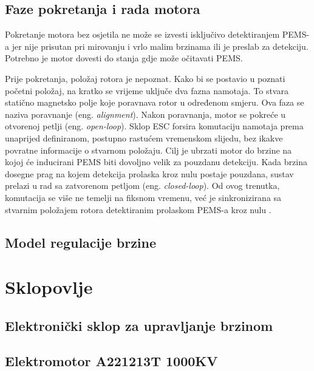 \documentclass[diplomskirad]{fer}
\begin{document}
\newpage

\section{Faze pokretanja i rada motora}

Pokretanje motora bez osjetila ne može se izvesti isključivo detektiranjem
PEMS-a jer nije prisutan pri mirovanju i vrlo malim brzinama ili je preslab za
detekciju. Potrebno je motor dovesti do stanja gdje može očitavati PEMS.

Prije pokretanja, položaj rotora je nepoznat. Kako bi se postavio u poznati
početni položaj, na kratko se vrijeme uključe dva fazna namotaja. To stvara
statično magnetsko polje koje poravnava rotor u određenom smjeru. Ova faza se
naziva poravnanje (eng. \textit{alignment}). Nakon poravnanja, motor se pokreće
u otvorenoj petlji (eng. \textit{open-loop}). Sklop ESC forsira komutaciju
namotaja prema unaprijed definiranom, postupno rastućem vremenskom slijedu, bez
ikakve povratne informacije o stvarnom položaju. Cilj je ubrzati motor do
brzine na kojoj će inducirani PEMS biti dovoljno velik za pouzdanu detekciju.
Kada brzina dosegne prag na kojem detekcija prolaska kroz nulu postaje
pouzdana, sustav prelazi u rad sa zatvorenom petljom (eng.
\textit{closed-loop}). Od ovog trenutka, komutacija se više ne temelji na
fiksnom vremenu, već je sinkronizirana sa stvarnim položajem rotora
detektiranim prolaskom PEMS-a kroz nulu \cite{Recasens2021}.

\section{Model regulacije brzine}

\chapter{Sklopovlje}
\label{pog:sklopovlje}
\section{Elektronički sklop za upravljanje brzinom}
\section{Elektromotor A2212\/13T 1000KV}
\end{document}
